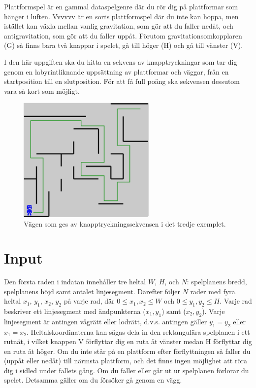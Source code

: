 
Plattformspel är en gammal dataspelgenre där du rör dig på plattformar som hänger i luften. Vvvvvv är en sorts plattformspel där du inte kan hoppa, men istället kan växla mellan vanlig gravitation, som gör att du faller nedåt, och antigravitation, som gör att du faller uppåt. Förutom gravitationsomkopplaren (G) så finns bara två knappar i spelet, gå till höger (H) och gå till vänster (V).

I den här uppgiften ska du hitta en sekvens av knapptryckningar som tar dig genom en labyrintliknande uppsättning av plattformar och väggar, från en startposition till en slutposition. För att få full poäng ska sekvensen dessutom vara så kort som möjligt.

\begin{figure}[ht!]
\centering
\includegraphics[width=0.6\textwidth]{spelplan.pdf}
\caption{Vägen som ges av knapptryckningssekvensen i det tredje exemplet.}
\label{overflow}
\end{figure}


\section*{Input}

Den första raden i indatan innehåller tre heltal $W$, $H$, och $N$: spelplanens bredd, spelplanens höjd samt antalet linjesegment. Därefter följer $N$ rader med fyra heltal $x_1$, $y_1$, $x_2$, $y_2$ på varje rad, där $0 \le x_1,x_2 \le W$ och $0 \le y_1,y_2 \le H$. Varje rad beskriver ett linjesegment med ändpunkterna ($x_1, y_1$) samt ($x_2, y_2$). Varje linjesegment är antingen vågrätt eller lodrätt, d.v.s. antingen gäller $y_1=y_2$ eller $x_1=x_2$. Heltalskoordinaterna kan sägas dela in den rektangulära spelplanen i ett rutnät, i vilket knappen V förflyttar dig en ruta åt vänster medan H förflyttar dig en ruta åt höger. Om du inte står på en plattform efter förflyttningen så faller du (uppåt eller nedåt) till närmsta plattform, och det finns ingen möjlighet att röra dig i sidled under fallets gång. Om du faller eller går ut ur spelplanen förlorar du spelet. Detsamma gäller om du försöker gå genom en vägg.

